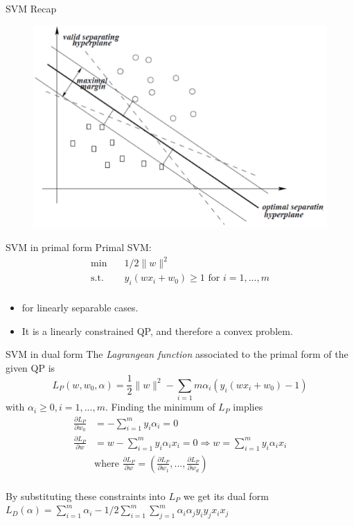 \documentclass[draft]{beamer}
\begin{document}
\begin{frame}
	{SVM Recap} 
	\begin{figure}
		\includegraphics[width=.75\textwidth]{2018-03-05-10-14-45.png} 
		\end{figure}
	
\end{frame}

\begin{frame}
	{SVM in primal form} 
	Primal SVM:
	\begin{equation*}
		\begin{aligned}
			\min \quad & 1/2 \|w\|^2\\
			\mathrm{s.t.} \quad  & y_i(wx_i+w_0)\ge 1 \text{ for } i=1,...,m\\ 
		\end{aligned}
	\end{equation*}
	\begin{itemize}
		\item for linearly separable cases. 
		\item It is a linearly constrained QP, and therefore a convex problem.
	\end{itemize}
\end{frame}
\begin{frame}
	{SVM in dual form} 
	The \emph{Lagrangean function} associated to the primal form of the given QP is \[
		L_P(w,w_0,\alpha)=\frac{1}{2}\|w\|^2 - \sum_{i=1}{m} \alpha_i(y_i(wx_i+w_0)-1)
	\]
	with $\alpha_i\ge 0, i =1,...,m$. Finding the minimum of $L_P$ implies
	\begin{equation*}
		\begin{aligned}
			\frac{\partial L_P}{\partial w_0}&=-\sum_{i=1}^{m}y_i\alpha_i=0  \\ 
			\frac{\partial L_P}{\partial w}&=w-\sum_{i=1}^{m}y_i \alpha_i x_i=0 \Rightarrow w=\sum_{i=1}^{m}y_i \alpha_i x_i  \\ 
			\quad & \text{where } \frac{\partial L_P}{\partial w}=(\frac{\partial L_P}{\partial w_1}, ..., \frac{\partial L_P}{\partial w_d}) \\
		\end{aligned}
	\end{equation*}
	
	By substituting these constraints into $L_P$ we get its dual form
	$L_D(\alpha) = \sum_{i=1}^{m} \alpha_i - 1/2 \sum_{i=1}^{m} \sum_{j=1}^{m} \alpha_i \alpha_j y_i y_j x_i x_j$

\end{frame}
\end{document}
